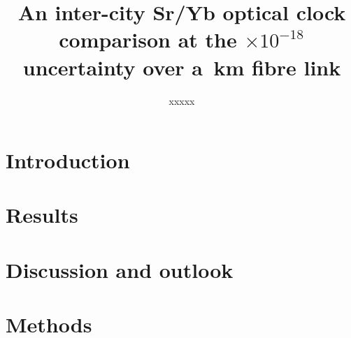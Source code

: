 \documentclass[11pt,a4paper]{article}
\title{An inter-city Sr/Yb optical clock comparison at the
\uTotalShort$\times10^{-18}$ uncertainty over a \fibreKm\,km fibre link}
\author{%
  xxxxx%
}
\date{}
\begin{document}
\maketitle

\begin{abstract}
\sloppy

\end{abstract}

\section{Introduction}
\label{sec:intro}


\section{Results}
\label{sec:results}


\section{Discussion and outlook}
\label{sec:discussion}





\section*{Methods}

\end{document}
